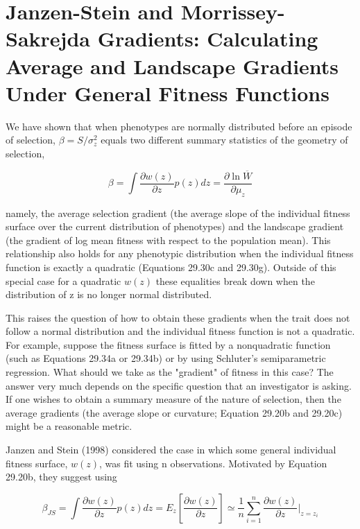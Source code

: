 \documentclass{article}
\begin{document}
\section{Janzen-Stein and Morrissey-Sakrejda Gradients: Calculating Average and Landscape Gradients Under General Fitness Functions}
We have shown that when phenotypes are normally distributed before an episode of selection,  $ \beta = S/\sigma_{z}^{2} $ equals two different summary statistics of the geometry of selection,

\begin{equation}
\beta=\int\frac{\partial w(z)}{\partial z}p(z)dz=\frac{\partial\ln\overline{W}}{\partial\mu_{z}}
\end{equation}

namely, the average selection gradient (the average slope of the individual fitness surface over the current distribution of phenotypes) and the landscape gradient (the gradient of log mean fitness with respect to the population mean). This relationship also holds for any phenotypic distribution when the individual fitness function is exactly a quadratic (Equations 29.30c and 29.30g). Outside of this special case for a quadratic  $ w(z) $ these equalities break down when the distribution of z is no longer normal distributed.

This raises the question of how to obtain these gradients when the trait does not follow a normal distribution and the individual fitness function is not a quadratic. For example, suppose the fitness surface is fitted by a nonquadratic function (such as Equations 29.34a or 29.34b) or by using Schluter's semiparametric regression. What should we take as the "gradient" of fitness in this case? The answer very much depends on the specific question that an investigator is asking. If one wishes to obtain a summary measure of the nature of selection, then the average gradients (the average slope or curvature; Equation 29.20b and 29.20c) might be a reasonable metric.

Janzen and Stein (1998) considered the case in which some general individual fitness surface,  $ w(z) $, was fit using n observations. Motivated by Equation 29.20b, they suggest using

\begin{equation}
\beta_{JS}=\int\frac{\partial w(z)}{\partial z}p(z)dz=E_{z}\left[\frac{\partial w(z)}{\partial z}\right]\simeq\frac{1}{n}\sum_{i=1}^{n}\frac{\partial w(z)}{\partial z}\bigg|_{z=z_{i}}
\tag{29.35a}
\label{eq:29_35a}
\end{equation}
\end{document}
